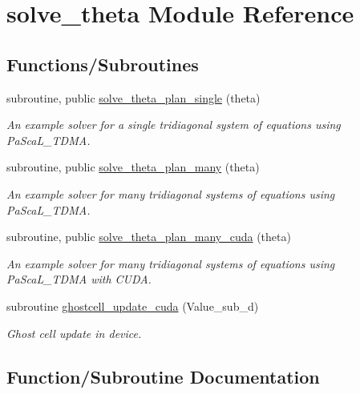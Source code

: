 \hypertarget{namespacesolve__theta}{}\section{solve\+\_\+theta Module Reference}
\label{namespacesolve__theta}
\subsection*{Functions/\+Subroutines}
\begin{DoxyCompactItemize}
\item 
subroutine, public \hyperlink{namespacesolve__theta_a215d44e312ec3ab2a3ab44fa0613b100}{solve\+\_\+theta\+\_\+plan\+\_\+single} (theta)
\begin{DoxyCompactList}\small\item\em An example solver for a single tridiagonal system of equations using Pa\+Sca\+L\+\_\+\+T\+D\+MA. \end{DoxyCompactList}\item 
subroutine, public \hyperlink{namespacesolve__theta_a0b7fdb576c007dc344092bf40efb0f4b}{solve\+\_\+theta\+\_\+plan\+\_\+many} (theta)
\begin{DoxyCompactList}\small\item\em An example solver for many tridiagonal systems of equations using Pa\+Sca\+L\+\_\+\+T\+D\+MA. \end{DoxyCompactList}\item 
subroutine, public \hyperlink{namespacesolve__theta_a84c4bdc671112259790470f6ad4c7e4c}{solve\+\_\+theta\+\_\+plan\+\_\+many\+\_\+cuda} (theta)
\begin{DoxyCompactList}\small\item\em An example solver for many tridiagonal systems of equations using Pa\+Sca\+L\+\_\+\+T\+D\+MA with C\+U\+DA. \end{DoxyCompactList}\item 
subroutine \hyperlink{namespacesolve__theta_a75284cf6dd015edde5309be8368c4c9e}{ghostcell\+\_\+update\+\_\+cuda} (Value\+\_\+sub\+\_\+d)
\begin{DoxyCompactList}\small\item\em Ghost cell update in device. \end{DoxyCompactList}\end{DoxyCompactItemize}


\subsection{Function/\+Subroutine Documentation}
\mbox{\label{namespacesolve__theta_a75284cf6dd015edde5309be8368c4c9e}} 
